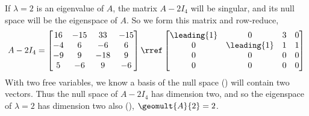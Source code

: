If $\lambda=2$ is an eigenvalue of $A$, the matrix $A-2I_4$ will be singular, and its null space will be the eigenspace of $A$.  So we form this matrix and row-reduce,
%
\begin{equation*}
A-2I_4=
\begin{bmatrix}
16 & -15 & 33 & -15\\
-4 & 6 & -6 & 6\\
-9 & 9 & -18 & 9\\
5 & -6 & 9 & -6
\end{bmatrix}
\rref
\begin{bmatrix}
\leading{1} & 0 & 3 & 0\\
0 & \leading{1} & 1 & 1\\
0 & 0 & 0 & 0\\
0 & 0 & 0 & 0
\end{bmatrix}
\end{equation*}
%
With two free variables, we know a basis of the null space () will contain two vectors.  Thus the null space of $A-2I_4$ has dimension two, and so the eigenspace of $\lambda=2$ has dimension two also (), $\geomult{A}{2}=2$.
